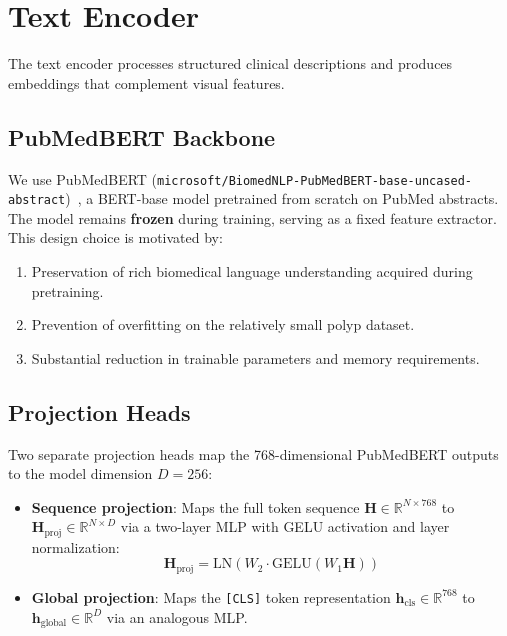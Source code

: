 \section{Text Encoder}
\label{sec:approach:text}

The text encoder processes structured clinical descriptions and produces embeddings that complement visual features.

\subsection{PubMedBERT Backbone}
\label{sec:approach:pubmedbert}

We use \ac{PubMedBERT} (\texttt{microsoft/BiomedNLP-Pub\-Med\-BERT-base-uncased-abstract})~\cite{gu2021pubmedbert}, a BERT-base model pretrained from scratch on PubMed abstracts. The model remains \textbf{frozen} during training, serving as a fixed feature extractor. This design choice is motivated by:

\begin{enumerate}
	\item Preservation of rich biomedical language understanding acquired during pretraining.
	\item Prevention of overfitting on the relatively small polyp dataset.
	\item Substantial reduction in trainable parameters and memory requirements.
\end{enumerate}

\subsection{Projection Heads}
\label{sec:approach:projection}

Two separate projection heads map the 768-dimensional PubMedBERT outputs to the model dimension $D = 256$:

\begin{itemize}
	\item \textbf{Sequence projection}: Maps the full token sequence $\mathbf{H} \in \mathbb{R}^{N \times 768}$ to $\mathbf{H}_{\text{proj}} \in \mathbb{R}^{N \times D}$ via a two-layer MLP with GELU activation and layer normalization:
	\begin{equation}
		\mathbf{H}_{\text{proj}} = \text{LN}\left(W_2 \cdot \text{GELU}(W_1 \mathbf{H})\right)
	\end{equation}
	
	\item \textbf{Global projection}: Maps the \texttt{[CLS]} token representation $\mathbf{h}_{\text{cls}} \in \mathbb{R}^{768}$ to $\mathbf{h}_{\text{global}} \in \mathbb{R}^{D}$ via an analogous MLP.
\end{itemize}

